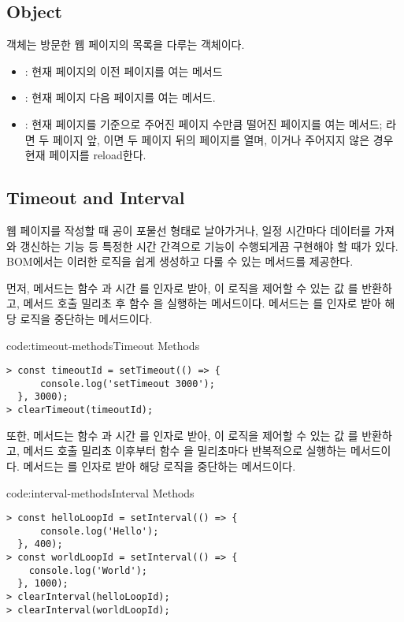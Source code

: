 \subsection*{ Object}

 객체는 방문한 웹 페이지의 목록을 다루는 객체이다.

\begin{itemize}
    \item {}: 현재 페이지의 이전 페이지를 여는 메서드
    \item {}: 현재 페이지 다음 페이지를 여는 메서드.
    \item {}: 현재 페이지를 기준으로 주어진 페이지 수만큼 떨어진 페이지를 여는 메서드; 라면 두 페이지 앞, 이면 두 페이지 뒤의 페이지를 열며, 이거나 주어지지 않은 경우 현재 페이지를 reload한다.
\end{itemize}

\subsection*{Timeout and Interval}

웹 페이지를 작성할 때 공이 포물선 형태로 날아가거나, 일정 시간마다 데이터를 가져와 갱신하는 기능 등 특정한 시간 간격으로 기능이 수행되게끔 구현해야 할 때가 있다. BOM에서는 이러한 로직을 쉽게 생성하고 다룰 수 있는 메서드를 제공한다.

먼저,  메서드는 함수 과 시간 를 인자로 받아, 이 로직을 제어할 수 있는 값 를 반환하고, 메서드 호출  밀리초 후 함수 을 실행하는 메서드이다.  메서드는 를 인자로 받아 해당 로직을 중단하는 메서드이다.

\begin{codeenv}{code:timeout-methods}{Timeout Methods}\begin{verbatim}
> const timeoutId = setTimeout(() => {
      console.log('setTimeout 3000');
  }, 3000);
> clearTimeout(timeoutId);
\end{verbatim}
\end{codeenv}

또한,  메서드는 함수 과 시간 를 인자로 받아, 이 로직을 제어할 수 있는 값 를 반환하고, 메서드 호출  밀리초 이후부터 함수 을  밀리초마다 반복적으로 실행하는 메서드이다.  메서드는 를 인자로 받아 해당 로직을 중단하는 메서드이다.

\begin{codeenv}{code:interval-methods}{Interval Methods}\begin{verbatim}
> const helloLoopId = setInterval(() => {
      console.log('Hello');
  }, 400);
> const worldLoopId = setInterval(() => {
    console.log('World');
  }, 1000);
> clearInterval(helloLoopId);
> clearInterval(worldLoopId);
\end{verbatim}
\end{codeenv}
